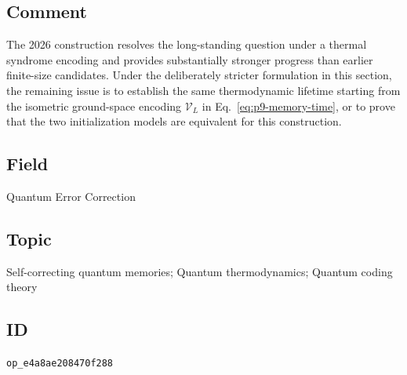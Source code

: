 \subsection*{Comment}

The 2026 construction resolves the long-standing question under a thermal
syndrome encoding and provides substantially stronger progress than earlier
finite-size candidates.  Under the deliberately stricter formulation in this
section, the remaining issue is to establish the same thermodynamic lifetime
starting from the isometric ground-space encoding $\mathcal V_L$ in
Eq.~\eqref{eq:p9-memory-time}, or to prove that the two initialization models
are equivalent for this construction.

\subsection*{Field}

Quantum Error Correction

\subsection*{Topic}

Self-correcting quantum memories; Quantum thermodynamics; Quantum coding theory

\subsection*{ID}

\texttt{op\_e4a8ae208470f288}
